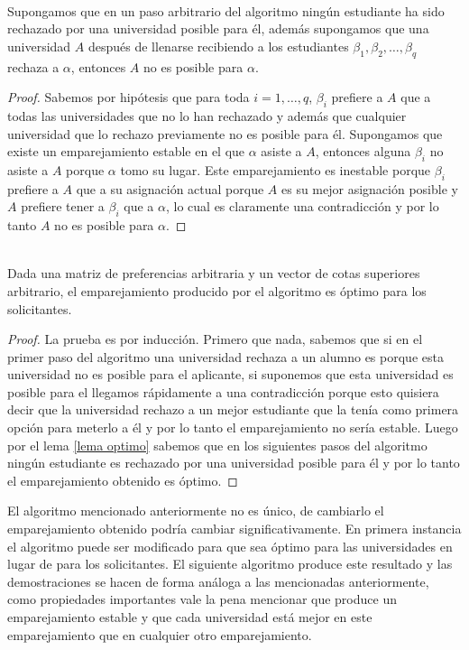 \begin{lem} 
\label{lema optimo} 
\cite{GaleShapley} \\
Supongamos que en un paso arbitrario del algoritmo ningún estudiante ha sido rechazado por una universidad posible para él, además supongamos que una universidad $A$ después de llenarse recibiendo a los estudiantes $\beta_1,\beta_2,\dots,\beta_q$ rechaza a $\alpha$, entonces $A$ no es posible para $\alpha$.
\end{lem}
\begin{proof}
Sabemos por hipótesis que para toda $i=1,\dots,q$, $\beta_i$ prefiere a $A$ que a todas las universidades que no lo han rechazado y además que cualquier universidad que lo rechazo previamente no es posible para él. Supongamos que existe un emparejamiento estable en el que $\alpha$ asiste a $A$, entonces alguna $\beta_i$ no asiste a $A$ porque $\alpha$ tomo su lugar. Este emparejamiento es inestable porque $\beta_i$ prefiere a $A$ que a su asignación actual porque $A$ es su mejor asignación posible y $A$ prefiere tener a $\beta_i$ que a $\alpha$, lo cual es claramente una contradicción y por lo tanto $A$ no es posible para $\alpha$.
\end{proof}

\begin{teo}
\label{optimo}
\cite{GaleShapley} \\
Dada una matriz de preferencias arbitraria y un vector de cotas superiores arbitrario, el emparejamiento producido por el algoritmo es óptimo para los solicitantes.
\end{teo}
\begin{proof}
La prueba es por inducción. Primero que nada, sabemos que si en el primer paso del algoritmo una universidad rechaza a un alumno es porque esta universidad no es posible para el aplicante, si suponemos que esta universidad es posible para el llegamos rápidamente a una contradicción porque esto quisiera decir que la universidad rechazo a un mejor estudiante que la tenía como primera opción para meterlo a él y por lo tanto el emparejamiento no sería estable. Luego por el lema \ref{lema optimo} sabemos que en los siguientes pasos del algoritmo ningún estudiante es rechazado por una universidad posible para él y por lo tanto el emparejamiento obtenido es óptimo. 
\end{proof}

El algoritmo mencionado anteriormente no es único, de cambiarlo el emparejamiento obtenido podría cambiar significativamente. En primera instancia el algoritmo puede ser modificado para que sea óptimo para las universidades en lugar de para los solicitantes. El siguiente algoritmo produce este resultado y las demostraciones se hacen de forma análoga a las mencionadas anteriormente, como propiedades importantes vale la pena mencionar que produce un emparejamiento estable y que cada universidad está mejor en este emparejamiento que en cualquier otro emparejamiento. 

